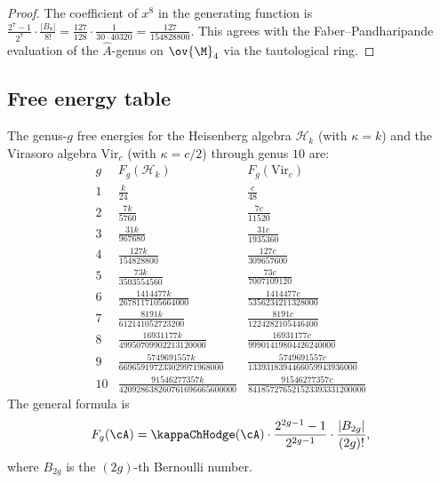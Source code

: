 \begin{proof}
The coefficient of $x^8$ in the generating function is
$\frac{2^7 - 1}{2^7} \cdot \frac{|B_8|}{8!} = \frac{127}{128} \cdot \frac{1}{30 \cdot 40320}
= \frac{127}{154828800}$.
This agrees with the Faber--Pandharipande evaluation of the $\hat{A}$-genus on
$\ov{\M}_4$ via the tautological ring.
\end{proof}

\subsection{Free energy table}

\begin{theorem}
The genus-$g$ free energies for the Heisenberg algebra $\mathcal{H}_k$ (with
$\kappa = k$) and the Virasoro algebra $\mathrm{Vir}_c$ (with $\kappa = c/2$)
through genus $10$ are:
\[
\renewcommand{\arraystretch}{1.4}
\begin{array}{c|c|c}
g & F_g(\mathcal{H}_k) & F_g(\mathrm{Vir}_c) \\
\hline
1 & \frac{k}{24} & \frac{c}{48} \\[3pt]
2 & \frac{7k}{5760} & \frac{7c}{11520} \\[3pt]
3 & \frac{31k}{967680} & \frac{31c}{1935360} \\[3pt]
4 & \frac{127k}{154828800} & \frac{127c}{309657600} \\[3pt]
5 & \frac{73k}{3503554560} & \frac{73c}{7007109120} \\[3pt]
6 & \frac{1414477k}{2678117105664000} & \frac{1414477c}{5356234211328000} \\[3pt]
7 & \frac{8191k}{612141052723200} & \frac{8191c}{1224282105446400} \\[3pt]
8 & \frac{16931177k}{49950709902213120000} & \frac{16931177c}{99901419804426240000} \\[3pt]
9 & \frac{5749691557k}{669659197233029971968000} & \frac{5749691557c}{1339318394466059943936000} \\[3pt]
10 & \frac{91546277357k}{420928638260761696665600000} & \frac{91546277357c}{841857276521523393331200000}
\end{array}
\]
The general formula is
\begin{equation}
\label{eq:fg-general}
F_g(\cA)
= \kappaChHodge(\cA) \cdot \frac{2^{2g-1} - 1}{2^{2g-1}} \cdot \frac{|B_{2g}|}{(2g)!},
\end{equation}
where $B_{2g}$ is the $(2g)$-th Bernoulli number.
\end{theorem}

